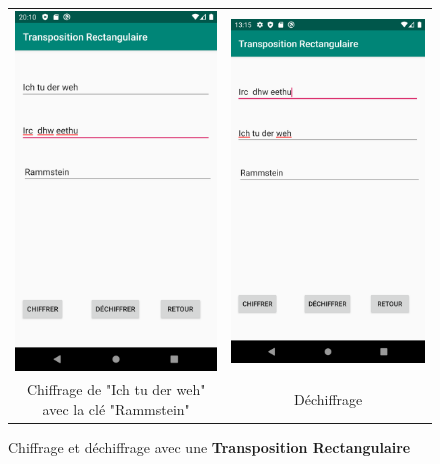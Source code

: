 \documentclass{article}
\begin{document}
\begin{figure}[b!]
    \centering
    \begin{tabular}{cc}
      \includegraphics[width=.35\linewidth]{./img/transpo_e.png} &
      \includegraphics[width=.35\linewidth]{./img/transpo_d.png} \\
      Chiffrage de "Ich tu der weh" avec la clé "Rammstein" & Déchiffrage \\
    \end{tabular}
    \caption{Chiffrage et déchiffrage avec une \textbf{Transposition Rectangulaire}}\label{fig:transpo}
\end{figure}
\end{document}
